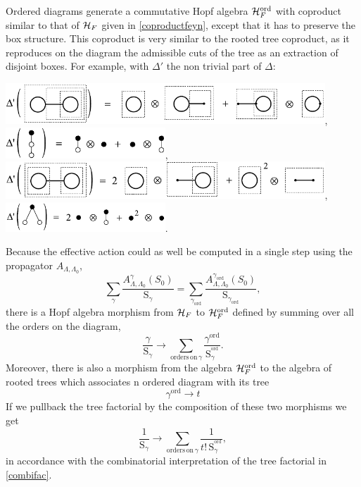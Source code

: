 \documentclass[12pt,here,feynmf]{article}
\begin{document}
Ordered diagrams generate a commutative Hopf algebra
${\cal H}_{F}^{\mathrm{ord}}$ with coproduct similar to
that of ${\cal H}_{F}$ given in \eqref{coproductfeyn}, except that it has to preserve the box structure. This coproduct is very similar to the rooted tree coproduct, as it reproduces on the diagram the admissible cuts of the tree as an extraction of disjoint boxes. For example, with $\Delta'$ the non trivial part of
$\Delta$:
\begin{center}
\includegraphics[width=12cm]{_pic2.pdf},\\
\includegraphics[width=6cm]{_pic3.pdf},\\
\includegraphics[width=12cm]{_pic1.pdf},\\
\includegraphics[width=6cm]{_pic4.pdf}.\\
\end{center}
Because the effective action could as well be computed in a single step using the propagator $A_{\Lambda,\Lambda_{0}}$, 
\begin{equation}
\sum_{\gamma}\frac{A_{\Lambda,\Lambda_{0}}^{\gamma}(S_{0})}{\mathrm{S}_{\gamma}}
=\sum_{\gamma_{\mathrm{ord}}}\frac{A_{\Lambda,\Lambda_{0}}^{\gamma_{\mathrm{ord}}}(S_{0})}{\mathrm{S}_{\gamma_{\mathrm{ord}}}},
\end{equation}
there is a Hopf algebra morphism from ${\cal H}_{F}$ to ${\cal H}_{F}^{\mathrm{ord}}$ defined by summing over all the orders on the diagram,
\begin{equation}
\frac{\gamma}{{\mathrm{S}}_{\gamma}}\rightarrow
\mathop{\sum}\limits_{\mathrm{ orders\, on}\,\gamma}
\frac{\gamma^{\mathrm{ord}}}{{\mathrm{
S}}_{\gamma}^{^{\mathrm{ord}}}}.
\end{equation}
Moreover, there is also a morphism from the algebra ${\cal H}_{F}^{\mathrm{ord}}$ to the algebra of rooted trees which associates n ordered diagram with its tree
\begin{equation}
\gamma^{\mathrm{ord}}\rightarrow t
\end{equation}
If we pullback  the tree factorial by the composition of these two morphisms we get
\begin{equation}
\frac{1}{{\mathrm{S}}_{\gamma}}\rightarrow
\mathop{\sum}\limits_{\mathrm{ orders\, on}\,\gamma}
\frac{1}{t!\,{\mathrm{
S}}_{\gamma}^{^{\mathrm{ord}}}},
\end{equation}
in accordance with the combinatorial interpretation of the tree factorial in \eqref{combifac}.
\end{document}
